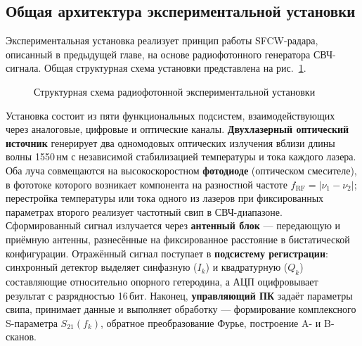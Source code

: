 \subsection{Общая архитектура экспериментальной установки}

Экспериментальная установка реализует принцип работы SFCW-радара, описанный в
предыдущей главе, на основе радиофотонного генератора СВЧ-сигнала. Общая
структурная схема установки представлена на рис.~\ref{fig:setup-block-diagram}.

\begin{figure}[H]
    \centering
    \caption{Структурная схема радиофотонной экспериментальной установки}
    \label{fig:setup-block-diagram}
\end{figure}

Установка состоит из пяти функциональных подсистем, взаимодействующих через
аналоговые, цифровые и оптические каналы. \textbf{Двухлазерный оптический
источник} генерирует два одномодовых оптических излучения вблизи длины волны
1550\,нм с независимой стабилизацией температуры и тока каждого лазера. Оба
луча совмещаются на высокоскоростном \textbf{фотодиоде} (оптическом смесителе),
в фототоке которого возникает компонента на разностной частоте
$f_{\mathrm{RF}} = |\nu_1 - \nu_2|$; перестройка температуры или тока одного
из лазеров при фиксированных параметрах второго реализует частотный свип в
СВЧ-диапазоне. Сформированный сигнал излучается через \textbf{антенный блок} ---
передающую и приёмную антенны, разнесённые на фиксированное расстояние в
бистатической конфигурации. Отражённый сигнал поступает в \textbf{подсистему
регистрации}: синхронный детектор выделяет синфазную ($I_k$) и квадратурную
($Q_k$) составляющие относительно опорного гетеродина, а АЦП оцифровывает
результат с разрядностью 16\,бит. Наконец, \textbf{управляющий ПК} задаёт
параметры свипа, принимает данные и выполняет обработку --- формирование
комплексного S-параметра $S_{21}(f_k)$, обратное преобразование Фурье,
построение A- и B-сканов.

